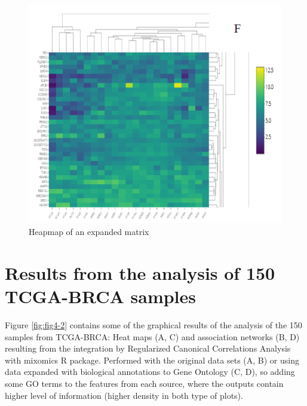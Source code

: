 \documentclass[a4paper, nobind]{templates/ociamthesis}
\begin{document}
\begin{figure}

{\centering \includegraphics[width=0.95\linewidth]{figures/chapter4/4-1_heatmap_expanded} 

}

\caption{Heapmap of an expanded matrix}\label{fig:fig4-1}
\end{figure}

\hypertarget{results-from-the-analysis-of-150-tcga-brca-samples}{%
\section{Results from the analysis of 150 TCGA-BRCA samples}\label{results-from-the-analysis-of-150-tcga-brca-samples}}

Figure \ref{fig:fig4-2} contains some of the graphical results of the analysis of the 150 samples from TCGA-BRCA: Heat maps (A, C) and association networks (B, D) resulting from the integration by Regularized Canonical Correlations Analysis with mixomics R package. Performed with the original data sets (A, B) or using data expanded with biological annotations to Gene Ontology (C, D), so adding some GO terms to the features from each source, where the outputs contain higher level of information (higher density in both type of plots).
\end{document}
